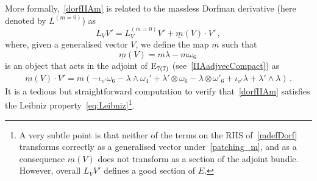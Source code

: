 \documentclass[debug]{phd}
\begin{document}
						More formally,~\eqref{dorfIIAm} is related to the massless Dorfman derivative (here denoted by $L^{(m=0)}$) as
								\begin{equation}\label{mdefDorf}
									L_V V' = L^{(m=0)}_V V' + \underline{m}(V) \cdot V'\,,
								\end{equation}
						where, given a generalised vector $V$, we define the map $\underline{m}$ such that
								\begin{equation}
									\underline{m}(V) = m\lambda - m \omega_6 \, 
								\end{equation}
						is an object that acts in the adjoint of $\mathrm{E}_{7(7)}$ (see~\eqref{IIAadjvecCompact}) as
								\begin{equation}\label{madj}
									\begin{split}
										\underline{m}(V)\cdot V' = m \left( - \iota_{v'} \omega_6 - \lambda \wedge \omega_4' + \lambda' \otimes \omega_6 - \lambda \otimes \omega'_6 + \iota_{v'} \lambda + \lambda' \wedge \lambda\right)\,.
									\end{split}
								\end{equation}
						It is a tedious but straightforward computation to verify that~\eqref{dorfIIAm} satisfies the Leibniz property~\eqref{eq:Leibniz}\footnote{%
							A very subtle point is that neither of the terms on the RHS of~\eqref{mdefDorf} transforms correctly as a generalised vector under~\eqref{patching_m}, and as a consequence $\underline{m}(V)$ does not transform as a section of the adjoint bundle. However, overall $L_V V'$ defines a good section of $E$.%
							}.
\end{document}
